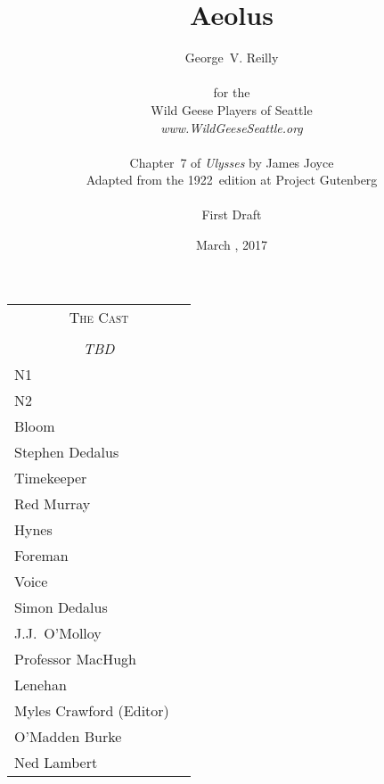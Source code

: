 


\title{\Huge Aeolus}
\author{George~V. Reilly\\
\\
{\small for the}\\
Wild Geese Players of Seattle\\
{\emph{www.WildGeeseSeattle.org}}\\
\\
{\small Chapter~7 of \emph{Ulysses} by James Joyce}\\
{\small Adapted from the 1922~edition at Project Gutenberg}
\\
\\
{\small First Draft}}
\date{March , 2017}
\raggedbottom



\maketitle
\thispagestyle{empty}
\pagebreak

\begin{tabular}{lp{10cm}}
    \multicolumn{2}{c}{\Large \textsc{The Cast}} \\
\\
    \multicolumn{2}{c}{\large \textit{TBD}} \\
N1 \\
N2 \\
Bloom \\
Stephen Dedalus \\
Timekeeper \\
Red Murray \\
Hynes \\
Foreman \\
Voice \\
Simon Dedalus \\
J.J.~O'Molloy \\
Professor MacHugh \\
Lenehan \\
Myles Crawford (Editor) \\
O'Madden Burke \\
Ned Lambert \\
\end{tabular}

\thispagestyle{empty}
\newpage


